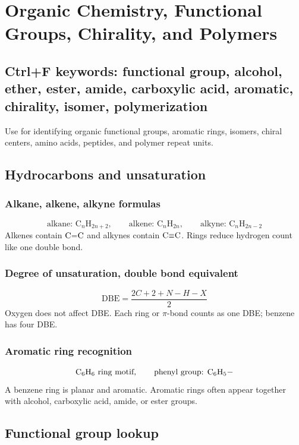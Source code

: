 \section{Organic Chemistry, Functional Groups, Chirality, and Polymers}

\subsection{Ctrl+F keywords: functional group, alcohol, ether, ester, amide, carboxylic acid, aromatic, chirality, isomer, polymerization}
Use for identifying organic functional groups, aromatic rings, isomers, chiral centers, amino acids, peptides, and polymer repeat units.

\subsection{Hydrocarbons and unsaturation}

\subsubsection{Alkane, alkene, alkyne formulas}
\[
\text{alkane: }\mathrm{C}_n\mathrm{H}_{2n+2}, \qquad
\text{alkene: }\mathrm{C}_n\mathrm{H}_{2n}, \qquad
\text{alkyne: }\mathrm{C}_n\mathrm{H}_{2n-2}
\]
Alkenes contain \(\ce{C=C}\) and alkynes contain \(\ce{C#C}\). Rings reduce hydrogen count like one double bond.

\subsubsection{Degree of unsaturation, double bond equivalent}
\[
\mathrm{DBE}=\frac{2C+2+N-H-X}{2}
\]
Oxygen does not affect DBE. Each ring or \(\pi\)-bond counts as one DBE; benzene has four DBE.

\subsubsection{Aromatic ring recognition}
\[
\ce{C6H6}\ \text{ring motif}, \qquad \text{phenyl group: }\mathrm{C_6H_5{-}}
\]
A benzene ring is planar and aromatic. Aromatic rings often appear together with alcohol, carboxylic acid, amide, or ester groups.

\subsection{Functional group lookup}

